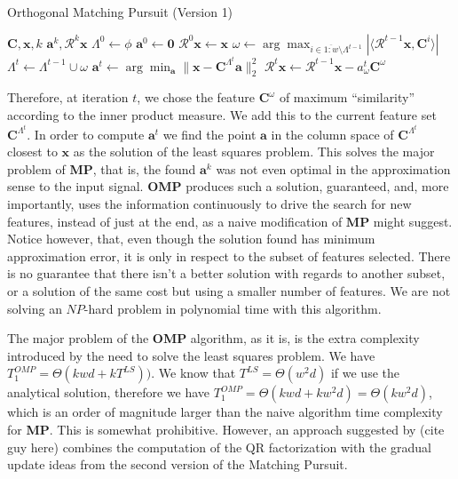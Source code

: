 \documentclass[12pt,a4paper,oneside,english]{UPBThesis}
\newcommand{\hcrange}[2]{\overline{{#1}\colon\!\!{#2}}}
\begin{document}
\begin{algorithm}
\caption{Orthogonal Matching Pursuit (Version 1)}
\label{algo:OrthogonalMatchingPursuitMethodV1}
\begin{algorithmic}
\Require $\textbf{C},\textbf{x},k$
\Ensure $\textbf{a}^k,\mathcal{R}^k\textbf{x}$
\State $\Lambda^0 \gets \phi$
\State $\textbf{a}^0 \gets \textbf{0}$
\State $\mathcal{R}^0\textbf{x} \gets \textbf{x}$
\For {$t = \hcrange{1}{k}$}
\State $\omega \gets \arg \max_{i \in \hcrange{1}{w} \setminus \Lambda^{t-1}} \left| \langle \mathcal{R}^{t-1}\textbf{x} , \textbf{C}^i \rangle \right|$
\State $\Lambda^t \gets \Lambda^{t-1} \cup \omega$
\State $\textbf{a}^t \gets \arg\min_{\textbf{a}} {\| \textbf{x} - \textbf{C}^{\Lambda^t}\textbf{a} \|_2^2}$
\State $\mathcal{R}^t\textbf{x} \gets \mathcal{R}^{t-1}\textbf{x} - a_\omega^t\textbf{C}^\omega$
\EndFor
\end{algorithmic}
\end{algorithm}

Therefore, at iteration $t$, we chose the feature $\textbf{C}^\omega$ of maximum ``similarity'' according to the inner product measure. We add this to the current feature set $\textbf{C}^{\Lambda^t}$. In order to compute $\textbf{a}^t$ we find the point $\textbf{a}$ in the column space of $\textbf{C}^{\Lambda^t}$ closest to $\textbf{x}$ as the solution of the least squares problem. This solves the major problem of \textbf{MP}, that is, the found $\textbf{a}^k$ was not even optimal in the approximation sense to the input signal. \textbf{OMP} produces such a solution, guaranteed, and, more importantly, uses the information continuously to drive the search for new features, instead of just at the end, as a naive modification of $\textbf{MP}$ might suggest. Notice however, that, even though the solution found has minimum approximation error, it is only in respect to the subset of features selected. There is no guarantee that there isn't a better solution with regards to another subset, or a solution of the same cost but using a smaller number of features. We are not solving an $NP$-hard problem in polynomial time with this algorithm.

The major problem of the \textbf{OMP} algorithm, as it is, is the extra complexity introduced by the need to solve the least squares problem. We have $T_1^{OMP} = \Theta(kwd + kT^{LS}))$. We know that $T^{LS} = \Theta(w^2d)$ if we use the analytical solution, therefore we have $T_1^{OMP} = \Theta(kwd + kw^2d) = \Theta(kw^2d)$, which is an order of magnitude larger than the naive algorithm time complexity for \textbf{MP}. This is somewhat prohibitive. However, an approach suggested by (cite guy here) combines the computation of the QR factorization with the gradual update ideas from the second version of the Matching Pursuit.
\end{document}
